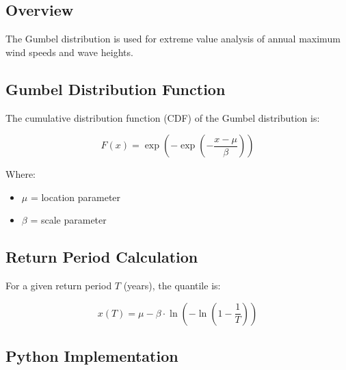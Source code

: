\documentclass[12pt]{article}
\begin{document}
\subsection{Overview}

The Gumbel distribution is used for extreme value analysis of annual maximum wind speeds and wave heights.

\subsection{Gumbel Distribution Function}

The cumulative distribution function (CDF) of the Gumbel distribution is:

\begin{equation}
F(x) = \exp\left(-\exp\left(-\frac{x - \mu}{\beta}\right)\right)
\end{equation}

Where:
\begin{itemize}
    \item $\mu$ = location parameter
    \item $\beta$ = scale parameter
\end{itemize}

\subsection{Return Period Calculation}

For a given return period $T$ (years), the quantile is:

\begin{equation}
x(T) = \mu - \beta \cdot \ln\left(-\ln\left(1 - \frac{1}{T}\right)\right)
\end{equation}

\subsection{Python Implementation}
\end{document}

